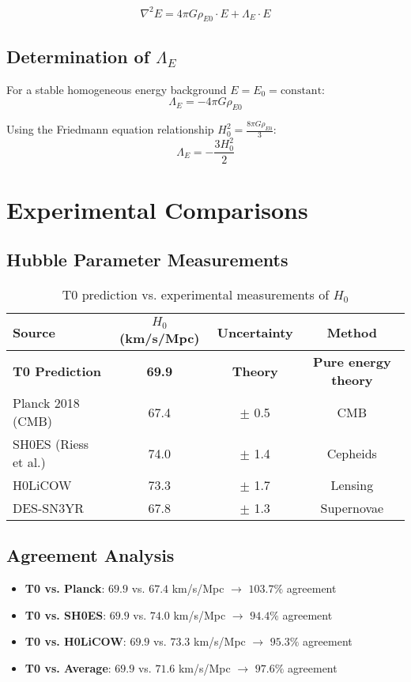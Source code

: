 \documentclass[12pt,a4paper]{article}
\begin{document}
	\begin{equation}
		\nabla^2 E = 4\pi G \rho_{E0} \cdot E + \Lambda_E \cdot E
	\end{equation}
	
	\subsection{Determination of $\Lambda_E$}
	For a stable homogeneous energy background $E = E_0 = \text{constant}$:
	\begin{equation}
		\Lambda_E = -4\pi G \rho_{E0}
	\end{equation}
	
	Using the Friedmann equation relationship $H_0^2 = \frac{8\pi G \rho_{E0}}{3}$:
	\begin{equation}
		\Lambda_E = -\frac{3H_0^2}{2}
	\end{equation}
	
	\section{Experimental Comparisons}
	
	\subsection{Hubble Parameter Measurements}
	
	\begin{table}[htbp]
		\centering
		\begin{tabular}{lccc}
			\toprule
			\textbf{Source} & \textbf{$H_0$ (km/s/Mpc)} & \textbf{Uncertainty} & \textbf{Method} \\
			\midrule
			\rowcolor{green!20}
			\textbf{T0 Prediction} & \textbf{69.9} & \textbf{Theory} & \textbf{Pure energy theory} \\
			Planck 2018 (CMB) & 67.4 & $\pm$ 0.5 & CMB \\
			SH0ES (Riess et al.) & 74.0 & $\pm$ 1.4 & Cepheids \\
			H0LiCOW & 73.3 & $\pm$ 1.7 & Lensing \\
			DES-SN3YR & 67.8 & $\pm$ 1.3 & Supernovae \\
			\bottomrule
		\end{tabular}
		\caption{T0 prediction vs. experimental measurements of $H_0$}
		\label{tab:h0_comparison}
	\end{table}
	
	\subsection{Agreement Analysis}
	\begin{itemize}
		\item \textbf{T0 vs. Planck}: $69.9$ vs. $67.4$ km/s/Mpc $\rightarrow$ $103.7\%$ agreement
		\item \textbf{T0 vs. SH0ES}: $69.9$ vs. $74.0$ km/s/Mpc $\rightarrow$ $94.4\%$ agreement
		\item \textbf{T0 vs. H0LiCOW}: $69.9$ vs. $73.3$ km/s/Mpc $\rightarrow$ $95.3\%$ agreement
		\item \textbf{T0 vs. Average}: $69.9$ vs. $71.6$ km/s/Mpc $\rightarrow$ $97.6\%$ agreement
	\end{itemize}
	
\end{document}
